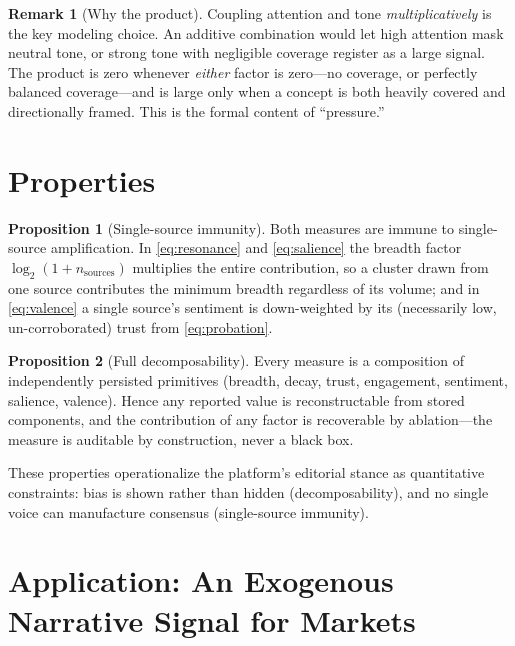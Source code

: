 \documentclass[11pt,a4paper]{article}
\theoremstyle{definition}
\newtheorem{remark}{Remark}[section]
\newtheorem{proposition}{Proposition}[section]
\begin{document}
\begin{remark}[Why the product]
\label{rem:product}
Coupling attention and tone \emph{multiplicatively} is the key modeling choice. An additive
combination would let high attention mask neutral tone, or strong tone with negligible coverage
register as a large signal. The product is zero whenever \emph{either} factor is zero---no coverage,
or perfectly balanced coverage---and is large only when a concept is both heavily covered and
directionally framed. This is the formal content of ``pressure.''
\end{remark}

\section{Properties}
\label{sec:properties}

\begin{proposition}[Single-source immunity]
\label{prop:single}
Both measures are immune to single-source amplification. In \eqref{eq:resonance} and
\eqref{eq:salience} the breadth factor $\log_2(1+n_{\text{sources}})$ multiplies the entire
contribution, so a cluster drawn from one source contributes the minimum breadth regardless of its
volume; and in \eqref{eq:valence} a single source's sentiment is down-weighted by its (necessarily
low, un-corroborated) trust from \eqref{eq:probation}.
\end{proposition}

\begin{proposition}[Full decomposability]
\label{prop:decomp}
Every measure is a composition of independently persisted primitives (breadth, decay, trust,
engagement, sentiment, salience, valence). Hence any reported value is reconstructable from stored
components, and the contribution of any factor is recoverable by ablation---the measure is auditable
by construction, never a black box.
\end{proposition}

These properties operationalize the platform's editorial stance as quantitative constraints: bias is
shown rather than hidden (decomposability), and no single voice can manufacture consensus (single-source
immunity).

\section{Application: An Exogenous Narrative Signal for Markets}
\label{sec:application}
\end{document}
